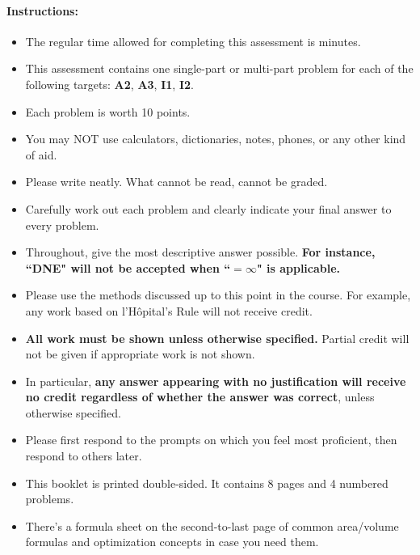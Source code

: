\documentclass[11pt]{article}
\begin{document}
{%

\paragraph*{Instructions:}

\begin{itemize}
    
    \item The regular time allowed for completing this assessment is  minutes.
    \item This assessment contains one single-part or multi-part problem for each of the following targets: {\bf\color{RedOrange}A2}, {\bf\color{RedOrange}A3}, {\bf\color{Fuchsia}I1}, {\bf\color{Fuchsia}I2}.
    \item Each problem is worth 10 points.
    \item You may NOT use calculators, dictionaries, notes, phones, or any other kind of aid.
    \item Please write neatly. What cannot be read, cannot be graded.
    \item Carefully work out each problem and clearly indicate your final answer to every problem.
    \item Throughout, give the most descriptive answer possible. \textbf{For instance, ``DNE" will not be accepted when ``$=\infty$" is applicable.}
    \item Please use the methods discussed up to this point in the course. For example, any work based on l'H\^opital's Rule will not receive credit.
    \item \textbf{All work must be shown unless otherwise specified.} Partial credit will not be given if appropriate work is not shown.
    \item In particular, {\bf any answer appearing with no justification will receive no credit regardless of whether the answer was correct}, unless otherwise specified.
    \item Please first respond to the prompts on which you feel most proficient, then respond to others later.
    \item This booklet is printed double-sided. It contains 8 pages and 4 numbered problems.
    \item There's a formula sheet on the second-to-last page of common area/volume formulas and optimization concepts in case you need them.
    \end{itemize}
    
    }
\end{document}
